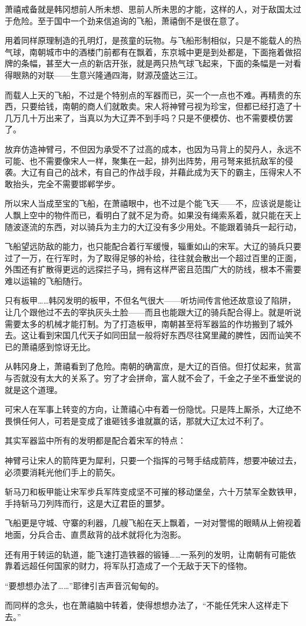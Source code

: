 萧禧戒备就是韩冈想前人所未想、思前人所未思的才能，这样的人，对于敌国太过于危险。至于国中一个劲来信追询的飞船，萧禧倒不是很在意了。

用着同样原理制造的孔明灯，是孩童的玩物。与飞船形制相似，只是不能载人的热气球，南朝城市中的酒楼门前都有在飘着，东京城中更是到处都是，下面拖着做招牌的条幅，甚至大一点的新店开张，就是两只热气球飞起来，下面的条幅是一对看得眼熟的对联——生意兴隆通四海，财源茂盛达三江。

而载人上天的飞船，不过是个特别点的军器而已，买一个一点也不难。再精贵的东西，只要给钱，南朝的商人们就敢卖。宋人将神臂弓视为珍宝，但都已经打造了十几万几十万出来了，当真以为大辽弄不到手吗？只是不便模仿、也不需要模仿罢了。

放弃仿造神臂弓，不但因为承受不了过高的成本，也因为马背上的契丹人，永远不可能、也不需要像宋人一样，聚集在一起，排列出阵势，用弓弩来抵抗敌军的侵袭。大辽有自己的战术，有自己的作战手段，并藉此成为天下的霸主，压得宋人不敢抬头，完全不需要邯郸学步。

所以宋人当成至宝的飞船，在萧禧眼中，也不过是个能飞天——不，应该说是能让人飘上空中的物件而已，看明白了就不足为奇。如果没有绳索系着，就只能在天上随波逐流的东西，对以骑兵为主力的大辽没有多少用处。不能跟着骑兵一起行动，

飞船望远防敌的能力，也只能配合着行军缓慢，辎重如山的宋军。大辽的骑兵只要过了一万，在行军时，为了取得足够的补给，往往就会散出一个超过百里的正面，外围还有扩散得更远的远探拦子马，拥有这样严密且范围广大的防线，根本不需要难以运输的飞船随行。

只有板甲……韩冈发明的板甲，不但名气很大——听坊间传言他还故意设了陷阱，让几个跟他过不去的宰执灰头土脸——而且也能跟大辽的骑兵配合得上。就是听说需要太多的机械才能打制。为了打造板甲，南朝甚至将军器监的作坊搬到了城外去。这让看到宋国几代天子如同田鼠一般将好东西尽往窝里藏的脾性，因而讪笑不已的萧禧感到惊讶无比。

从韩冈身上，萧禧看到了危险。南朝的确富庶，是大辽的百倍。但打仗起来，贫富与否就没有太大的关系了。穷了才会拼命，富人就不会了，千金之子坐不垂堂说的就是这个道理。

可宋人在军事上转变的方向，让萧禧心中有着一份隐忧。只是阵上厮杀，大辽绝不畏惧任何人，可若是变成了谁砸钱多谁就赢的话，那就大辽太过不利了。

其实军器监中所有的发明都是配合着宋军的特点：

神臂弓让宋人的箭阵更为犀利，只要一个指挥的弓弩手结成箭阵，想要冲破过去，必须要消耗光他们手上的箭矢。

斩马刀和板甲能让宋军步兵军阵变成坚不可摧的移动堡垒，六十万禁军全数铁甲，手持斩马刀列阵而行，这是大辽君臣的噩梦。

飞船更是守城、守寨的利器，几艘飞船在天上飘着，一对对警惕的眼睛从上俯视着地面，分兵合击、直贯敌背的战术就将化为泡影。

还有用于转运的轨道，能飞速打造铁器的锻锤……一系列的发明，让南朝有可能依靠着远超任何国家的财力，将军队打造成了一个无敌于天下的怪物。

“要想想办法了……”耶律引吉声音沉甸甸的。

而同样的念头，也在萧禧脑中转着，使得想想办法了，“不能任凭宋人这样走下去。”

